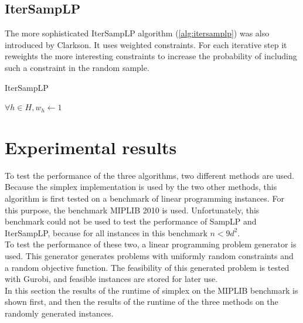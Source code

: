 \documentclass[nocopyrightspace]{acm_proc_article-sp}
\begin{document}
\subsection{IterSampLP}
The more sophisticated IterSampLP algorithm (\ref{alg:itersamplp}) was also introduced by Clarkson\cite{clarkson1995vegas}. It uses weighted constraints. For each iterative step it reweights the more interesting constraints to increase the probability of including such a constraint in the random sample.


\begin{algorithm}[h]
\label{alg:itersamplp}
\caption{IterSampLP}
$\forall h \in H, w_h \gets 1$ \;
\end{algorithm}

\section{Experimental results}
To test the performance of the three algorithms, two different methods are used. Because the simplex implementation is used by the two other methods, this algorithm is first tested  on a benchmark of linear programming instances. For this purpose, the benchmark MIPLIB 2010 \cite{KochEtAl2011} is used. Unfortunately, this benchmark could not be used to test the performance of SampLP and IterSampLP, because for all instances in this benchmark $n < 9d^2$. \\
To test the performance of these two, a linear programming problem generator is used. This generator generates problems with uniformly random constraints and a random objective function. The feasibility of this generated problem is tested with Gurobi, and feasible instances are stored for later use. \\
In this section the results of the runtime of simplex on the MIPLIB benchmark is shown first, and then the results of the runtime of the three methods on the randomly generated instances.
\end{document}
